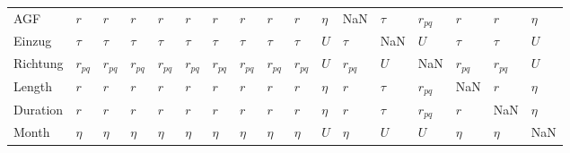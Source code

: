 \begin{tabular}{lllllllllllllllll}
AGF      &       $r$ &       $r$ &       $r$ &       $r$ &       $r$ &       $r$ &       $r$ &       $r$ &       $r$ &  $\eta$ &       NaN &  $\tau$ &  $r_{pq}$ &       $r$ &       $r$ &  $\eta$ \\
Einzug   &    $\tau$ &    $\tau$ &    $\tau$ &    $\tau$ &    $\tau$ &    $\tau$ &    $\tau$ &    $\tau$ &    $\tau$ &     $U$ &    $\tau$ &     NaN &       $U$ &    $\tau$ &    $\tau$ &     $U$ \\
Richtung &  $r_{pq}$ &  $r_{pq}$ &  $r_{pq}$ &  $r_{pq}$ &  $r_{pq}$ &  $r_{pq}$ &  $r_{pq}$ &  $r_{pq}$ &  $r_{pq}$ &     $U$ &  $r_{pq}$ &     $U$ &       NaN &  $r_{pq}$ &  $r_{pq}$ &     $U$ \\
Length   &       $r$ &       $r$ &       $r$ &       $r$ &       $r$ &       $r$ &       $r$ &       $r$ &       $r$ &  $\eta$ &       $r$ &  $\tau$ &  $r_{pq}$ &       NaN &       $r$ &  $\eta$ \\
Duration &       $r$ &       $r$ &       $r$ &       $r$ &       $r$ &       $r$ &       $r$ &       $r$ &       $r$ &  $\eta$ &       $r$ &  $\tau$ &  $r_{pq}$ &       $r$ &       NaN &  $\eta$ \\
Month    &    $\eta$ &    $\eta$ &    $\eta$ &    $\eta$ &    $\eta$ &    $\eta$ &    $\eta$ &    $\eta$ &    $\eta$ &     $U$ &    $\eta$ &     $U$ &       $U$ &    $\eta$ &    $\eta$ &     NaN \\
\bottomrule
\end{tabular}

